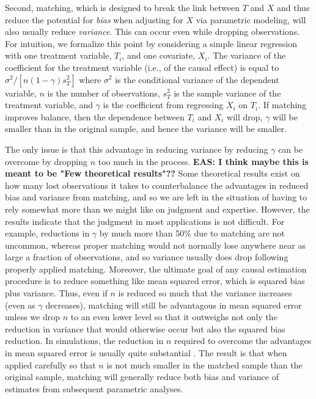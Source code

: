 \documentclass[11pt,titlepage]{article}
\begin{document}
Second, matching, which is designed to break the link between $T$ and
$X$ and thus reduce the potential for \emph{bias} when adjusting for
$X$ via parametric modeling, will also usually reduce \emph{variance}.
This can occur even while dropping observations.  For intuition, we
formalize this point by considering a simple linear regression with
one treatment variable, $T_i$, and one covariate, $X_i$.  The variance
of the coefficient for the treatment variable (i.e., of the causal
effect) is equal to $\sigma^2/[n (1-\gamma) s^2_T]$ where $\sigma^2$
is the conditional variance of the dependent variable, $n$ is the
number of observations, $s^2_T$ is the sample variance of the
treatment variable, and $\gamma$ is the coefficient from regressing
$X_i$ on $T_i$.  If matching improves balance, then the dependence
between $T_i$ and $X_i$ will drop, $\gamma$ will be smaller than in
the original sample, and hence the variance will be smaller.

The only issue is that this advantage in reducing variance by reducing
$\gamma$ can be overcome by dropping $n$ too much in the process.
{\bf EAS:  I think maybe this is meant to be "Few theoretical results"??}
Some theoretical results exist on how many 
lost observations it takes
to counterbalance the advantages in reduced bias and variance from
matching, and so we are left in the situation of having to rely
somewhat more than we might like on judgment and expertise.  However,
the results indicate that the judgment in most applications is not
difficult.  For example, reductions in $\gamma$ by much more than 50\%
due to matching are not uncommon, whereas proper matching would not
normally lose anywhere near as large a fraction of observations, and
so variance usually does drop following properly applied matching.
Moreover, the ultimate goal of any causal estimation procedure is to
reduce something like mean squared error, which is squared bias plus
variance.  Thus, even if $n$ is reduced so much that the variance
increases (even as $\gamma$ decreases), matching will still be
advantagous in mean squared error unless we drop $n$ to an even lower
level so that it outweighs not only the reduction in variance that
would otherwise occur but also the squared bias reduction.  In
simulations, the reduction in $n$ required to overcome the advantages
in mean squared error is usually quite substantial \citep{RubTho96}.
The result is that when applied carefully so that $n$ is not much
smaller in the matched sample than the original sample, matching will
generally reduce both bias and variance of estimates from subsequent
parametric analyses.
\end{document}

